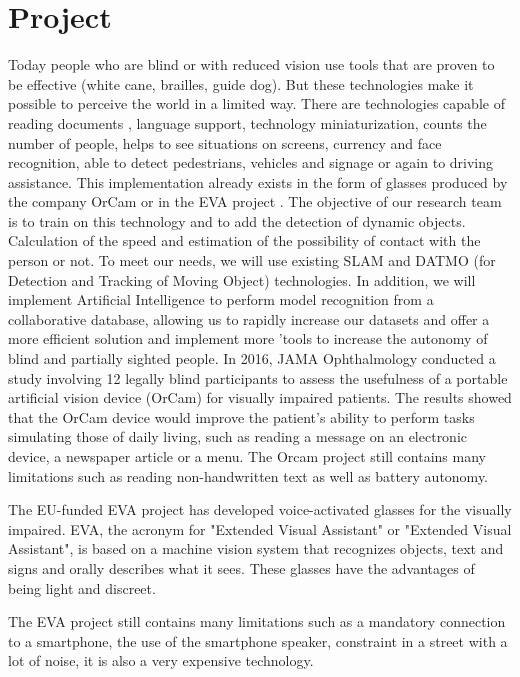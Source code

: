 \documentclass[conference,compsoc]{IEEEtran}
\begin{document}
\section{Project}
Today people who are blind or with reduced vision use tools that are proven to be effective (white cane, brailles, guide dog). But these technologies make it possible to perceive the world in a limited way.
There are technologies capable of reading documents \cite{neto_roberto_cam_reading_2014}, language support, technology miniaturization, counts the number of people, helps to see situations on screens, currency and face recognition, able to detect pedestrians, vehicles and signage or again to driving assistance. This implementation already exists in the form of glasses produced by the company OrCam \cite{orcam_2021} or in the EVA project \cite{eva}.
The objective of our research team is to train on this technology and to add the detection of dynamic objects. Calculation of the speed and estimation of the possibility of contact with the person or not.
To meet our needs, we will use existing SLAM and DATMO (for Detection and Tracking of Moving Object) \cite{Pancham2011-11} technologies. In addition, we will implement Artificial Intelligence to perform model recognition from a collaborative database, allowing us to rapidly increase our datasets and offer a more efficient solution and implement more 'tools to increase the autonomy of blind and partially sighted people.
In 2016, JAMA Ophthalmology \cite{adrienne_w.scott_2016} conducted a study involving 12 legally blind participants to assess the usefulness of a portable artificial vision device (OrCam) for visually impaired patients. The results showed that the OrCam device would improve the patient's ability to perform tasks simulating those of daily living, such as reading a message on an electronic device, a newspaper article or a menu.
The Orcam project still contains many limitations such as reading non-handwritten text as well as battery autonomy.
 
The EU-funded EVA project has developed voice-activated glasses for the visually impaired. EVA, the acronym for "Extended Visual Assistant" or "Extended Visual Assistant", is based on a machine vision system that recognizes objects, text and signs and orally describes what it sees. These glasses have the advantages of being light and discreet.

The EVA project still contains many limitations such as a mandatory connection to a smartphone, the use of the smartphone speaker, constraint in a street with a lot of noise, it is also a very expensive technology.
\end{document}
